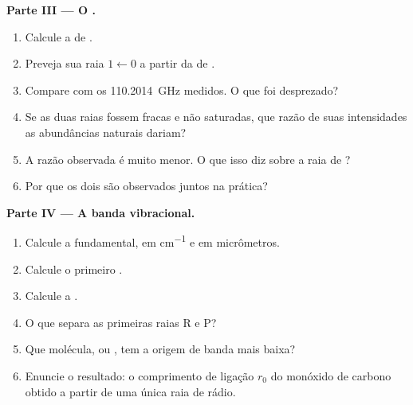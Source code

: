 \begin{problem}
\medskip\noindent\textbf{Parte III --- O .}
\begin{enumerate}[resume]
  \item Calcule a  de .
  \item Preveja sua raia $1 \leftarrow 0$ a partir da de .
  \item Compare com os \qty{110.2014}{GHz} medidos. O que foi desprezado?
  \item Se as duas raias fossem fracas e não saturadas, que razão de suas
        intensidades as abundâncias naturais dariam?
  \item A razão observada é muito menor. O que isso diz sobre a raia de
        ?
  \item Por que os dois  são observados juntos na prática?
\end{enumerate}

\medskip\noindent\textbf{Parte IV --- A banda vibracional.}
\begin{enumerate}[resume]
  \item Calcule a  fundamental, em \unit{cm^{-1}} e em
        micrômetros.
  \item Calcule o primeiro .
  \item Calcule a .
  \item O que separa as primeiras raias R e P?
  \item Que molécula,  ou , tem a origem de banda mais baixa?
  \item Enuncie o resultado: o comprimento de ligação $r_0$ do monóxido de carbono
        obtido a partir de uma única raia de rádio.
\end{enumerate}
\end{problem}
